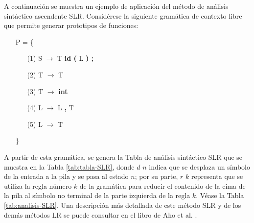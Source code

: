 A continuación se muestra un ejemplo de aplicación del método de análisis sintáctico ascendente SLR. Considérese la siguiente gramática de contexto libre que permite generar prototipos de funciones:
\begin{center}
\begin{itemize}
      \item[] {P}  =  \{  
        \begin{itemize}
         \item[(1)] S $\rightarrow$ T {\bf id (} L {\bf ) ;} 
         \item[(2)] T $\rightarrow$ T {\bf *}
         \item[(3)] T $\rightarrow$ {\bf int} 
         \item[(4)] L $\rightarrow$ L {\bf ,} T 
         \item[(5)] L $\rightarrow$ T 
      \end{itemize}
      \item[] \hspace{0.5cm} \}
    \end{itemize}
\end{center}


A partir de esta gramática, se genera la Tabla de análisis sintáctico SLR que se muestra en la Tabla \ref{tab:tabla-SLR}, donde $d$ $n$ indica que se desplaza un símbolo de la entrada a la pila y se pasa al estado $n$; por su parte, $r$ $k$ representa que se utiliza la regla número $k$ de la gramática para reducir el contenido de la cima de la pila al símbolo no terminal de la parte izquierda de la regla $k$. Véase la Tabla \ref{tab:analisis-SLR}.  Una descripción más detallada de este método SLR y de los demás métodos LR se puede consultar en el libro de Aho et al. \cite{aho2008}.

